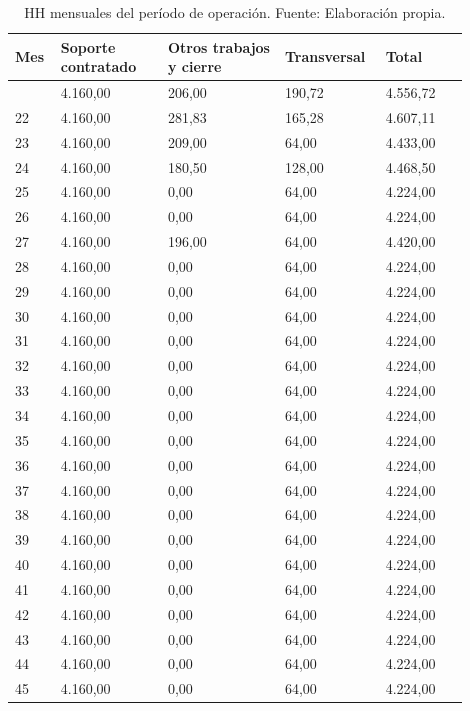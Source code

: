 \documentclass[11pt]{article}
\begin{document}
\begingroup
\small
\begin{longtable}{@{}p{0.08\linewidth}p{0.22\linewidth}p{0.24\linewidth}p{0.19\linewidth}p{0.17\linewidth}@{}}
\caption[HH mensuales del período de operación]{HH mensuales del período de operación. Fuente: Elaboración propia.}\label{tab:t15-7}\\
\toprule
\textbf{Mes} & \textbf{Soporte contratado} & \textbf{Otros trabajos y cierre} & \textbf{Transversal} & \textbf{Total} \\
\midrule
\endhead
\bottomrule
\endlastfoot
21 & 4.160,00 & 206,00 & 190,72 & 4.556,72 \\
22 & 4.160,00 & 281,83 & 165,28 & 4.607,11 \\
23 & 4.160,00 & 209,00 & 64,00 & 4.433,00 \\
24 & 4.160,00 & 180,50 & 128,00 & 4.468,50 \\
25 & 4.160,00 & 0,00 & 64,00 & 4.224,00 \\
26 & 4.160,00 & 0,00 & 64,00 & 4.224,00 \\
27 & 4.160,00 & 196,00 & 64,00 & 4.420,00 \\
28 & 4.160,00 & 0,00 & 64,00 & 4.224,00 \\
29 & 4.160,00 & 0,00 & 64,00 & 4.224,00 \\
30 & 4.160,00 & 0,00 & 64,00 & 4.224,00 \\
31 & 4.160,00 & 0,00 & 64,00 & 4.224,00 \\
32 & 4.160,00 & 0,00 & 64,00 & 4.224,00 \\
33 & 4.160,00 & 0,00 & 64,00 & 4.224,00 \\
34 & 4.160,00 & 0,00 & 64,00 & 4.224,00 \\
35 & 4.160,00 & 0,00 & 64,00 & 4.224,00 \\
36 & 4.160,00 & 0,00 & 64,00 & 4.224,00 \\
37 & 4.160,00 & 0,00 & 64,00 & 4.224,00 \\
38 & 4.160,00 & 0,00 & 64,00 & 4.224,00 \\
39 & 4.160,00 & 0,00 & 64,00 & 4.224,00 \\
40 & 4.160,00 & 0,00 & 64,00 & 4.224,00 \\
41 & 4.160,00 & 0,00 & 64,00 & 4.224,00 \\
42 & 4.160,00 & 0,00 & 64,00 & 4.224,00 \\
43 & 4.160,00 & 0,00 & 64,00 & 4.224,00 \\
44 & 4.160,00 & 0,00 & 64,00 & 4.224,00 \\
45 & 4.160,00 & 0,00 & 64,00 & 4.224,00 \\

\end{longtable}
\end{document}
